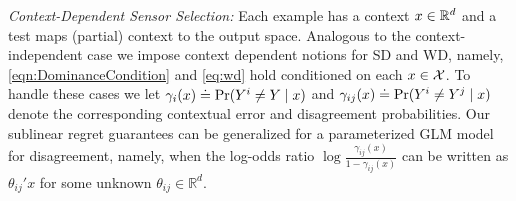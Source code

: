 \noindent
{\it Context-Dependent Sensor Selection:}
Each example has a context $x \in \mathbb{R}^d$ and a test maps (partial) context to the output space. Analogous to the context-independent case we impose context dependent notions for SD and WD, namely, \cref{eqn:DominanceCondition} and \cref{eq:wd} hold conditioned on each $x \in {\cal X}$. To handle these cases we let $\gamma_i(x)\doteq \Pr(Y^{i} \neq Y\mid x)$ and $\gamma_{ij}(x) \doteq \Pr(Y^{i} \neq Y^{j}\mid x)$ denote the corresponding contextual error and disagreement probabilities. Our sublinear regret guarantees can be generalized for a parameterized GLM model for disagreement, namely, when the log-odds ratio $\log \frac{\gamma_{ij}(x)}{1-\gamma_{ij}(x)}$ can be written as $\theta_{ij}'x$ for some unknown $\theta_{ij} \in \mathbb{R}^d$.
\vspace{-5pt}

